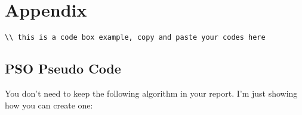\documentclass[12pt]{article}
\begin{document}
	
	
	
	
	
	 
	\newpage
	\section{Appendix}
	
	\begin{lstlisting}[basicstyle=\small]
		\\ this is a code box example, copy and paste your codes here
	\end{lstlisting}
	
	\subsection{PSO Pseudo Code}\label{appendixC}
	
	You don't need to keep the following algorithm in your report. I'm just showing how you can create one:
	
\end{document}
